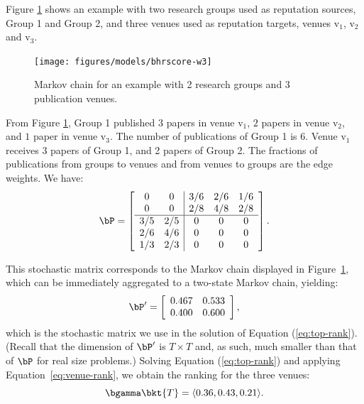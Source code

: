 Figure \ref{fig:ex1-MC} shows an example with two research groups used as reputation sources, Group 1 and Group 2, and three venues used as reputation targets, venues $\mbox{v}_1$, $\mbox{v}_2$ and $\mbox{v}_3$.
%
\begin{figure}[h]
   \centerline{\texttt{[image: figures/models/bhrscore-w3]}}
   \caption{Markov chain for an example with 2 research groups and 3 publication venues.}
   \label{fig:ex1-MC}
\end{figure}

From Figure \ref{fig:ex1-MC}, Group 1 published $3$ papers in venue $\mbox{v}_1$, $2$ papers in venue $\mbox{v}_2$, and $1$ paper in venue $\mbox{v}_3$. The number of publications of Group 1 is $6$. Venue $\mbox{v}_1$ receives $3$ papers of Group 1, and 2 papers of Group 2. The fractions of publications from groups to venues and from venues to groups are the edge weights. We have:
\[
\bP =
\left[
\begin{array}{c c | c c c }
0            &0             &3/6       &2/6         &1/6    \\
0            &0             &2/8       &4/8         &2/8    \\
\hline
3/5          &2/5           &0         &0           &0       \\
2/6          &4/6           &0         &0           &0       \\
1/3          &2/3           &0         &0           &0       \\
\end{array}
\right].
\]

This stochastic matrix corresponds to the Markov chain displayed in Figure~\ref{fig:ex1-MC}, which can be immediately aggregated to a two-state Markov chain, yielding:
%
\[
\bP^\prime = 
\left[
\begin{array}{c c }
0.467   &0.533 \\
0.400   &0.600
\end{array}
\right],
\]
\noindent which is the stochastic matrix we use in the solution of Equation (\ref{eq:top-rank}). (Recall that the dimension of $\bP^\prime$ is $T \times T$ and, as such, much smaller than that of $\bP$ for real size problems.) Solving Equation (\ref{eq:top-rank}) and applying Equation~\eqref{eq:venue-rank}, we obtain the ranking for the three venues: 
\begin{equation}
\bgamma\bkt{T} = \langle 0.36, 0.43, 0.21 \rangle.
\end{equation}

